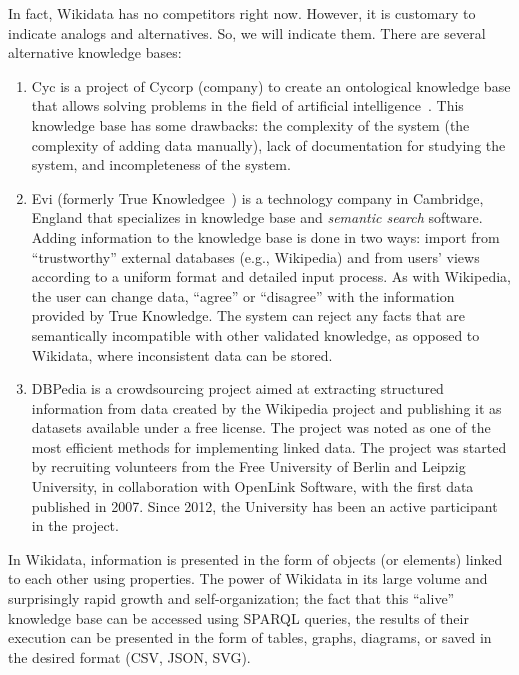 In fact, Wikidata has no competitors right now. However, it is customary to indicate analogs and alternatives. So, we will indicate them. There are several alternative knowledge bases:
\begin{enumerate}
\item Cyc is a project of Cycorp (company) to create an ontological knowledge base that allows solving problems in the field of artificial intelligence~. This knowledge base has some drawbacks: the complexity of the system (the complexity of adding data manually), lack of documentation for studying the system, and incompleteness of the system. 
\item Evi (formerly True Knowledgee~) is a technology company in Cambridge, England that specializes in knowledge base and \textit{semantic search} 
 software. Adding information to the knowledge base is done in two ways: import from ``trustworthy'' external databases (e.g., Wikipedia) and from users' views according to a uniform format and detailed input process. As with Wikipedia, the user can change
data, ``agree'' or ``disagree'' with the information provided by True Knowledge. The system can reject any facts that are semantically incompatible with other validated knowledge, as opposed to Wikidata, where inconsistent data can be stored.
\item DBPedia is a crowdsourcing project aimed at extracting structured information from data created by the Wikipedia project and publishing it as datasets available under a free license. The project was noted as one of the most efficient methods for implementing linked data.
The project was started by recruiting volunteers from the Free University of Berlin and Leipzig University, in collaboration with OpenLink Software, with the first data published in 2007. Since 2012, the University has been an active participant in the project.
\end{enumerate}
In Wikidata, information is presented in the form of objects (or elements) linked to each other using properties. The power of Wikidata in its large volume and surprisingly rapid growth and self-organization; the fact that this ``alive'' knowledge base can be accessed using SPARQL queries, the results of their execution can be presented in the form of tables, graphs, diagrams, or saved in the desired format (CSV, JSON, SVG).


